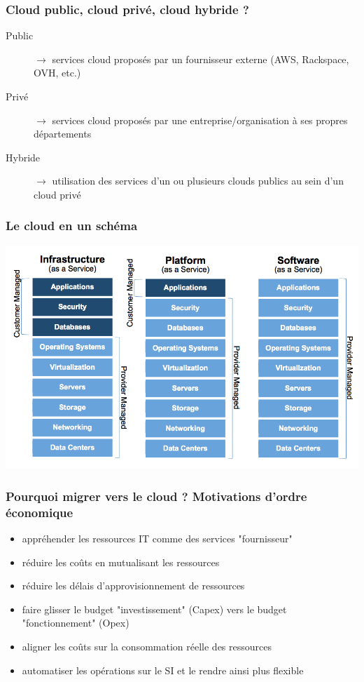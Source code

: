   \begin{frame}
    \frametitle{Cloud public, cloud privé, cloud hybride ?}
    \begin{description}
      \item[Public] $\rightarrow$ services cloud proposés par un fournisseur externe (AWS, Rackspace, OVH, etc.)\pause
      \item[Privé] $\rightarrow$ services cloud proposés par une entreprise/organisation à ses propres départements\pause
      \item[Hybride] $\rightarrow$ utilisation des services d'un ou plusieurs clouds publics au sein d'un cloud privé
    \end{description}
  \end{frame}

  \begin{frame}
    \frametitle{Le cloud en un schéma}
    \includegraphics[width=\linewidth,height=\textheight]{images/cloud.png}
  \end{frame}

  \begin{frame}
    \frametitle{Pourquoi migrer vers le cloud ? Motivations d'ordre économique}
    \begin{itemize}
      \item appréhender les ressources IT comme des services "fournisseur"\pause
      \item réduire les coûts en mutualisant les ressources\pause
      \item réduire les délais d'approvisionnement de ressources\pause
      \item faire glisser le budget "investissement" (Capex) vers le budget "fonctionnement" (Opex)\pause
      \item aligner les coûts sur la consommation réelle des ressources\pause
      \item automatiser les opérations sur le SI et le rendre ainsi plus flexible
    \end{itemize}
  \end{frame}

